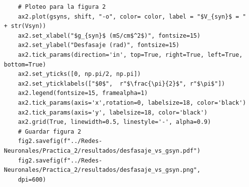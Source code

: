 \documentclass[11pt,twocolumn,twoside]{opticajnl}
\begin{document}
\begin{onecolumn}
\begin{lstlisting}
    # Ploteo para la figura 2
    ax2.plot(gsyns, shift, "-o", color= color, label = "$V_{syn}$ = " + str(Vsyn))
    ax2.set_xlabel("$g_{syn}$ (mS/cm$^2$)", fontsize=15)
    ax2.set_ylabel("Desfasaje (rad)", fontsize=15)
    ax2.tick_params(direction='in', top=True, right=True, left=True, bottom=True)
    ax2.set_yticks([0, np.pi/2, np.pi])
    ax2.set_yticklabels(["$0$",  r"$\frac{\pi}{2}$", r"$\pi$"])
    ax2.legend(fontsize=15, framealpha=1)
    ax2.tick_params(axis='x',rotation=0, labelsize=18, color='black')
    ax2.tick_params(axis='y', labelsize=18, color='black')
    ax2.grid(True, linewidth=0.5, linestyle='-', alpha=0.9)
    # Guardar figura 2
    fig2.savefig(f"../Redes-Neuronales/Practica_2/resultados/desfasaje_vs_gsyn.pdf")
    fig2.savefig(f"../Redes-Neuronales/Practica_2/resultados/desfasaje_vs_gsyn.png",
    dpi=600)
\end{lstlisting}
\end{onecolumn}
\end{document}
